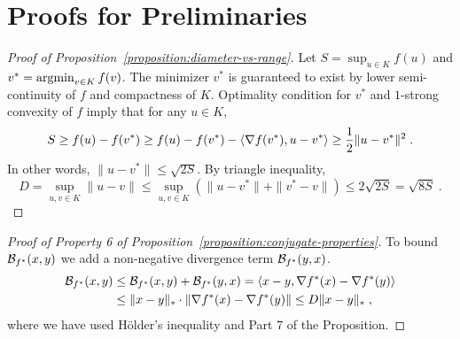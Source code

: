 \section{Proofs for Preliminaries}
\label{section:definitions-proofs}

\begin{proof}[Proof of Proposition~\ref{proposition:diameter-vs-range}]
Let $S = \sup_{u \in K} f(u)$ and $v^* = \operatorname*{argmin}_{v \in K} f(v)$. The minimizer
$v^*$ is guaranteed to exist by lower semi-continuity of $f$ and compactness of
$K$.  Optimality condition for $v^*$ and $1$-strong convexity of $f$ imply that
for any $u \in K$,
$$
S
\ge f(u) - f(v^*)
\ge f(u) - f(v^*) - \langle \nabla f(v^*), u - v^* \rangle
\ge \frac{1}{2}\|u - v^*\|^2 \; .
$$
In other words, $\|u - v^*\| \le \sqrt{2S}$. By triangle inequality,
$$
D = \sup_{u,v \in K} \|u - v\| \le \sup_{u,v \in K} \left( \|u - v^*\| + \|v^ * - v\| \right) \le 2\sqrt{2S} = \sqrt{8S} \; .
$$
\end{proof}

\begin{proof}[Proof of Property 6 of Proposition~\ref{proposition:conjugate-properties}]
To bound $\mathcal{B}_{f^*}(x,y)$ we add a non-negative divergence term $\mathcal{B}_{f^*}(y,x)$.
\begin{align*}
\mathcal{B}_{f^*}(x, y)
& \le \mathcal{B}_{f^*}(x,y) + \mathcal{B}_{f^*}(y,x)
= \langle x - y, \nabla f^*(x) - \nabla f^*(y) \rangle \\
& \le \|x - y\|_* \cdot \| \nabla f^*(x) - \nabla f^*(y) \|
\le D \|x - y\|_* \; ,
\end{align*}
where we have used H\"older's inequality and Part 7 of the Proposition.
\end{proof}
